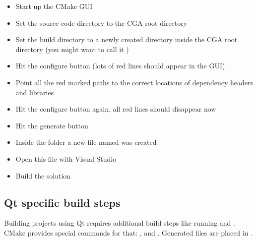 \begin{itemize}
	\item Start up the CMake GUI
	\item Set the source code directory to the CGA root directory
    \item Set the build directory to a newly created directory inside the CGA root directory (you might want to call it )
    \item Hit the configure button (lots of red lines should appear in the GUI)
    \item Point all the red marked paths to the correct locations of dependency headers and libraries
    \item Hit the configure button again, all red lines should disappear now
    \item Hit the generate button
    \item Inside the  folder a new file named  was created
    \item Open this file with Visual Studio
    \item Build the solution
\end{itemize}

\subsection{Qt specific build steps} Building projects using Qt requires additional build steps like running  and . CMake provides special commands for that: ,  and . Generated files are placed in .
